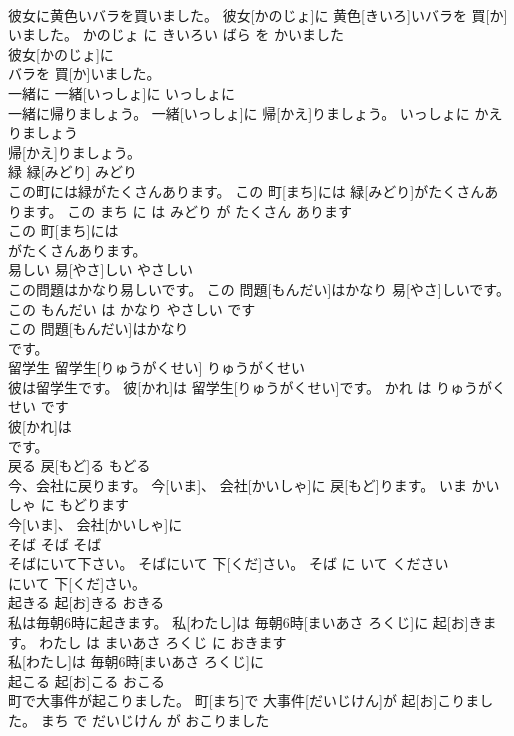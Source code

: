 \documentclass[8pt]{extreport}
\begin{document}
\begin{CJK}{UTF8}{min}
\\	彼女に黄色いバラを買いました。	彼女[かのじょ]に 黄色[きいろ]いバラを 買[か]いました。	かのじょ に きいろい ばら を かいました	
\\	彼女[かのじょ]に
\\	バラを 買[か]いました。		
\\	一緒に	一緒[いっしょ]に	いっしょに	
\\	一緒に帰りましょう。	一緒[いっしょ]に 帰[かえ]りましょう。	いっしょに かえりましょう	
\\	帰[かえ]りましょう。		
\\	緑	緑[みどり]	みどり	
\\	この町には緑がたくさんあります。	この 町[まち]には 緑[みどり]がたくさんあります。	この まち に は みどり が たくさん あります	
\\	この 町[まち]には
\\	がたくさんあります。		
\\	易しい	易[やさ]しい	やさしい	
\\	この問題はかなり易しいです。	この 問題[もんだい]はかなり 易[やさ]しいです。	この もんだい は かなり やさしい です	
\\	この 問題[もんだい]はかなり
\\	です。		
\\	留学生	留学生[りゅうがくせい]	りゅうがくせい	
\\	彼は留学生です。	彼[かれ]は 留学生[りゅうがくせい]です。	かれ は りゅうがくせい です	
\\	彼[かれ]は
\\	です。		
\\	戻る	戻[もど]る	もどる	
\\	今、会社に戻ります。	今[いま]、 会社[かいしゃ]に 戻[もど]ります。	いま かいしゃ に もどります	
\\	今[いま]、 会社[かいしゃ]に
\\	そば	そば	そば	
\\	そばにいて下さい。	そばにいて 下[くだ]さい。	そば に いて ください	
\\	にいて 下[くだ]さい。		
\\	起きる	起[お]きる	おきる	
\\	私は毎朝6時に起きます。	私[わたし]は 毎朝6時[まいあさ ろくじ]に 起[お]きます。	わたし は まいあさ ろくじ に おきます	
\\	私[わたし]は 毎朝6時[まいあさ ろくじ]に
\\	起こる	起[お]こる	おこる	
\\	町で大事件が起こりました。	町[まち]で 大事件[だいじけん]が 起[お]こりました。	まち で だいじけん が おこりました	

\end{CJK}
\end{document}
